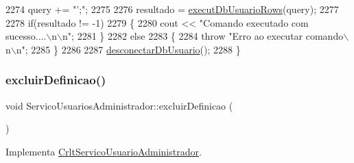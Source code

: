 \begin{DoxyCode}
2274       query += \textcolor{stringliteral}{"';"};
2275 
2276       resultado = \mbox{\hyperlink{comando_sql_8cpp_af54952694f2fa7d76f969fb74b853cb9}{executDbUsuarioRows}}(query);
2277 
2278       \textcolor{keywordflow}{if}(resultado != -1)
2279       \{
2280         cout << \textcolor{stringliteral}{"Comando executado com sucesso....\(\backslash\)n\(\backslash\)n"};
2281       \}
2282       \textcolor{keywordflow}{else}
2283       \{
2284         \textcolor{keywordflow}{throw} \textcolor{stringliteral}{"Erro ao executar comando\(\backslash\)n\(\backslash\)n"};
2285       \}
2286 
2287       \mbox{\hyperlink{comando_sql_8cpp_a969be9911913568e30d4ae8963338bc3}{desconectarDbUsuario}}();
2288   \}
\end{DoxyCode}
\mbox{\label{class_servico_usuarios_administrador_a1c78a37ca8e92725926d3f13299a50b6}} 
\subsubsection{\texorpdfstring{excluir\+Definicao()}{excluirDefinicao()}}
{\footnotesize\ttfamily void Servico\+Usuarios\+Administrador\+::excluir\+Definicao (\begin{DoxyParamCaption}{ }\end{DoxyParamCaption})\hspace{0.3cm}{\ttfamily [virtual]}}



Implementa \mbox{\hyperlink{class_crlt_servico_usuario_administrador_a37d525a705885131f08e8f74c0926578}{Crlt\+Servico\+Usuario\+Administrador}}.


